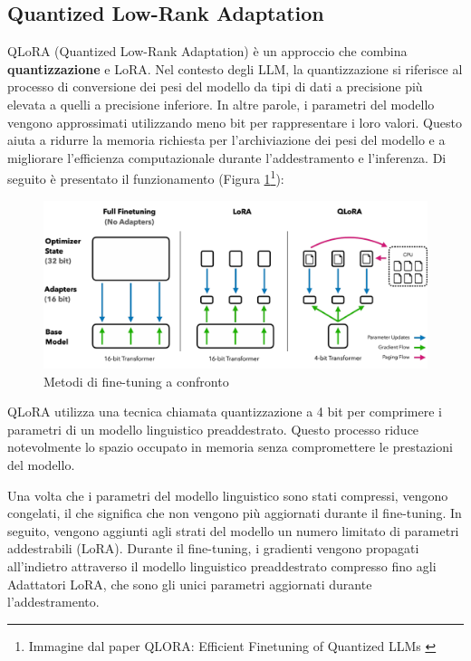 \subsection{Quantized Low-Rank Adaptation}\label{subsec:qlora}
QLoRA (Quantized Low-Rank Adaptation) è un approccio che combina \textbf{quantizzazione} e LoRA.
Nel contesto degli LLM, la quantizzazione si riferisce al processo di conversione dei pesi del modello da tipi di dati a precisione più elevata a quelli a precisione inferiore. In altre parole, i parametri del modello vengono approssimati utilizzando meno bit per rappresentare i loro valori. Questo aiuta a ridurre la memoria richiesta per l’archiviazione dei pesi del modello e a migliorare l’efficienza computazionale durante l’addestramento e l’inferenza. 
Di seguito è presentato il funzionamento (Figura \ref{fig:qlora_v_ft}\footnote{Immagine dal paper QLORA: Efficient Finetuning of Quantized LLMs \cite{dettmers2023qlora}}):

\begin{figure}[H]
	\centering
	\includegraphics[width=\textwidth]{Immagini/qlora.pdf}
	\caption{Metodi di fine-tuning a confronto}
	\label{fig:qlora_v_ft}
\end{figure}

QLoRA utilizza una tecnica chiamata quantizzazione a 4 bit per comprimere i parametri di un modello linguistico preaddestrato. Questo processo riduce notevolmente lo spazio occupato in memoria senza compromettere le prestazioni del modello.

Una volta che i parametri del modello linguistico sono stati compressi, vengono congelati, il che significa che non vengono più aggiornati durante il fine-tuning. In seguito, vengono aggiunti agli strati del modello un numero limitato di parametri addestrabili (LoRA). Durante il fine-tuning, i gradienti vengono propagati all'indietro attraverso il modello linguistico preaddestrato compresso fino agli Adattatori LoRA, che sono gli unici parametri aggiornati durante l'addestramento.

